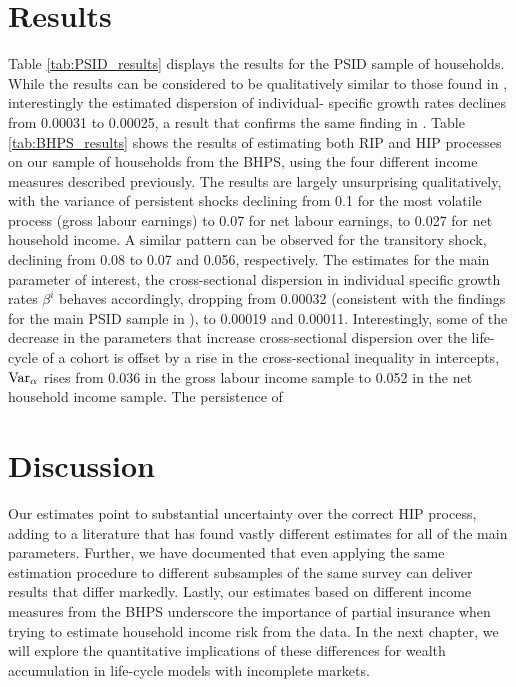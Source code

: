 \section{Results}
Table \ref{tab:PSID_results} displays the results for the PSID sample of households.
While the results can be considered to be qualitatively similar to those found
in \citet{Guvenen2009}, interestingly the estimated dispersion of individual-
specific growth rates declines from 0.00031 to 0.00025, a result that confirms
the same finding in \citet{Hryshko2012}. 
Table \ref{tab:BHPS_results} shows the results of estimating both RIP and HIP
processes on our sample of households from the BHPS, using the four different
income measures described previously. The results are largely unsurprising 
qualitatively, with the variance of persistent shocks declining from 0.1 for
the most volatile process (gross labour earnings) to 0.07 for net labour earnings,
to 0.027 for net household income. A similar pattern can be observed for the 
transitory shock, declining from 0.08 to 0.07 and 0.056, respectively. The 
estimates for the main parameter of interest, the cross-sectional dispersion 
in individual specific growth rates $\beta^i$ behaves accordingly, dropping from 
0.00032 (consistent with the findings for the main PSID sample in 
\citet{Guvenen2009}), to 0.00019 and 0.00011. Interestingly, some of the decrease
in the parameters that increase cross-sectional dispersion over the life-cycle
of a cohort is offset by a rise in the cross-sectional inequality in intercepts, 
$\mbox{Var}_{\alpha}$ rises from 0.036 in the gross labour income sample to 0.052 in 
the net household income sample. The persistence of 

\section{Discussion}
Our estimates point to substantial uncertainty over the correct HIP process, 
adding to a literature that has found vastly different estimates for all of the 
main parameters. Further, we have documented that even applying the same estimation
procedure to different subsamples of the same survey can deliver results that
differ markedly. Lastly, our estimates based on different income measures from 
the BHPS underscore the importance of partial insurance when trying to estimate
household income risk from the data. In the next chapter, we will explore the
quantitative implications of these differences for wealth accumulation in 
life-cycle models with incomplete markets.


